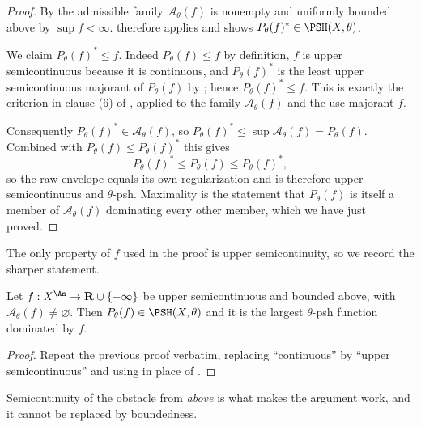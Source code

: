 \begin{proof}
By  the admissible family
\(\mathcal A_\theta(f)\) is nonempty and uniformly bounded above by
\(\sup f<\infty\).   therefore applies and
shows \(P_\theta(f)^*\in\PSH(X,\theta)\).

We claim \(P_\theta(f)^*\leq f\).  Indeed \(P_\theta(f)\leq f\) by
definition, \(f\) is upper semicontinuous because it is continuous, and
\(P_\theta(f)^*\) is the least upper semicontinuous majorant of
\(P_\theta(f)\) by ; hence
\(P_\theta(f)^*\leq f\).  This is exactly the criterion in clause (6) of
, applied to the family
\(\mathcal A_\theta(f)\) and the usc majorant \(f\).

Consequently \(P_\theta(f)^*\in\mathcal A_\theta(f)\), so
\(P_\theta(f)^*\leq\sup\mathcal A_\theta(f)=P_\theta(f)\).  Combined with
\(P_\theta(f)\leq P_\theta(f)^*\) this gives
\[
               P_\theta(f)^*\leq P_\theta(f)\leq P_\theta(f)^*,
\]
so the raw envelope equals its own regularization and is therefore upper
semicontinuous and \(\theta\)-psh.  Maximality is the statement that
\(P_\theta(f)\) is itself a member of \(\mathcal A_\theta(f)\) dominating
every other member, which we have just proved.
\end{proof}

The only property of \(f\) used in the proof is upper semicontinuity, so we
record the sharper statement.

\begin{corollary}
\label{cor:ch23-usc-obstacle}
Let \(f:X^{\An}\to\mathbf R\cup\{-\infty\}\) be upper semicontinuous and
bounded above, with \(\mathcal A_\theta(f)\ne\varnothing\).  Then
\(P_\theta(f)\in\PSH(X,\theta)\) and it is the largest \(\theta\)-psh
function dominated by \(f\).
\end{corollary}

\begin{proof}
Repeat the previous proof verbatim, replacing ``continuous'' by ``upper
semicontinuous'' and using  in place of
.
\end{proof}

Semicontinuity of the obstacle from \emph{above} is what makes the argument
work, and it cannot be replaced by boundedness.

